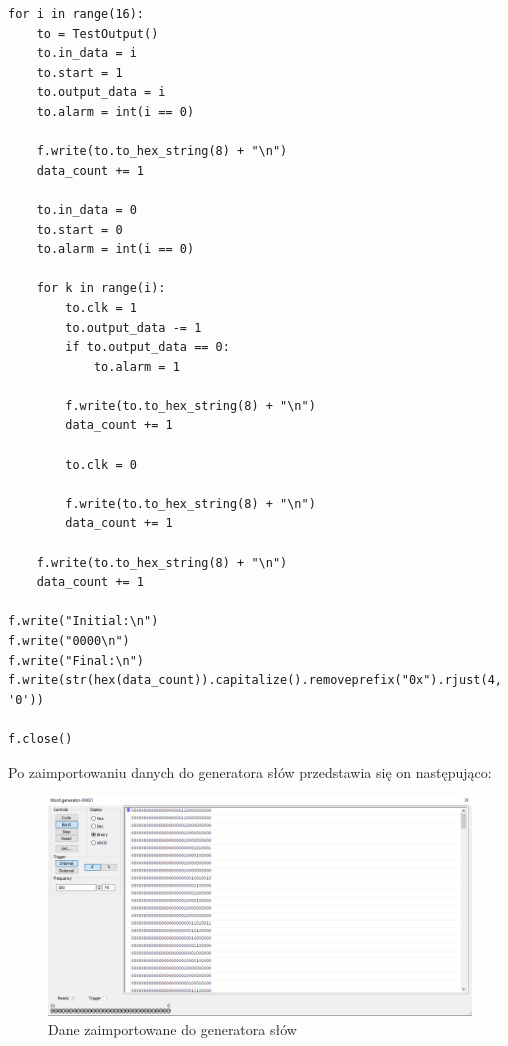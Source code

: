 \documentclass[a4paper]{article}
\begin{document}
\begin{verbatim}
for i in range(16):
    to = TestOutput()
    to.in_data = i
    to.start = 1
    to.output_data = i 
    to.alarm = int(i == 0)

    f.write(to.to_hex_string(8) + "\n")
    data_count += 1

    to.in_data = 0
    to.start = 0
    to.alarm = int(i == 0)

    for k in range(i):
        to.clk = 1
        to.output_data -= 1
        if to.output_data == 0:
            to.alarm = 1

        f.write(to.to_hex_string(8) + "\n")
        data_count += 1

        to.clk = 0

        f.write(to.to_hex_string(8) + "\n")
        data_count += 1

    f.write(to.to_hex_string(8) + "\n")
    data_count += 1

f.write("Initial:\n")
f.write("0000\n")
f.write("Final:\n")
f.write(str(hex(data_count)).capitalize().removeprefix("0x").rjust(4, '0'))

f.close()
\end{verbatim}
\Large

\pagebreak
Po zaimportowaniu danych do generatora słów przedstawia się on następująco:
\begin{figure}[H]
    \centering

    \includegraphics[width=\textwidth]{general_test_word_generator.png}
    \caption{Dane zaimportowane do generatora słów}
\end{figure}
\end{document}
